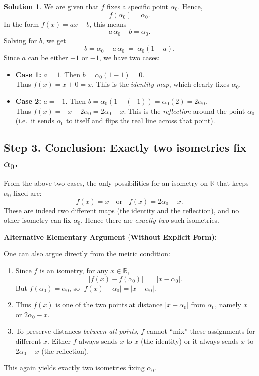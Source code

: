 \documentclass[12pt]{article}
\theoremstyle{definition} %
\newtheorem{solution}{Solution}
\theoremstyle{plain} %
\begin{document}
\begin{solution}
We are given that $f$ fixes a specific point $\alpha_0$. Hence,
\[
   f(\alpha_0) = \alpha_0.
\]
In the form $f(x) = ax + b$, this means
\[
   a\,\alpha_0 + b = \alpha_0.
\]
Solving for $b$, we get
\[
   b = \alpha_0 - a\,\alpha_0 \;=\; \alpha_0(1 - a).
\]
Since $a$ can be either $+1$ or $-1$, we have two cases:

\begin{itemize}
    \item \textbf{Case 1:} $a = 1$. Then $b = \alpha_0(1 - 1) = 0$.\\
          Thus $f(x) = x + 0 = x$. This is the \emph{identity map}, which clearly fixes $\alpha_0$.

    \item \textbf{Case 2:} $a = -1$. Then $b = \alpha_0(1 - (-1)) = \alpha_0(2) = 2\alpha_0$.\\
          Thus $f(x) = -x + 2\alpha_0 = 2\alpha_0 - x$. This is the \emph{reflection} around the point $\alpha_0$ (i.e.\ it sends $\alpha_0$ to itself and flips the real line across that point).
\end{itemize}

\subsection*{Step 3. Conclusion: Exactly two isometries fix $\alpha_0$.}

From the above two cases, the only possibilities for an isometry on $\mathbb{R}$ that keeps $\alpha_0$ fixed are:
\[
   f(x) = x
   \quad\text{or}\quad
   f(x) = 2\alpha_0 - x.
\]
These are indeed two different maps (the identity and the reflection), and no other isometry can fix $\alpha_0$. Hence there are \emph{exactly two} such isometries.

\bigskip
\noindent
\textbf{Alternative Elementary Argument (Without Explicit Form):}

One can also argue directly from the metric condition:
\begin{enumerate}
    \item Since $f$ is an isometry, for any $x \in \mathbb{R}$,
          \[
             |f(x) - f(\alpha_0)| \;=\; |x - \alpha_0|.
          \]
          But $f(\alpha_0) = \alpha_0$, so $|f(x) - \alpha_0| = |x - \alpha_0|$.
    \item Thus $f(x)$ is one of the two points at distance $|x - \alpha_0|$ from $\alpha_0$, namely $x$ or $2\alpha_0 - x$.
    \item To preserve distances \emph{between all points}, $f$ cannot ``mix'' these assignments for different $x$. Either $f$ always sends $x$ to $x$ (the identity) or it always sends $x$ to $2\alpha_0 - x$ (the reflection).
\end{enumerate}
This again yields exactly two isometries fixing $\alpha_0$.

\end{solution}
\end{document}

